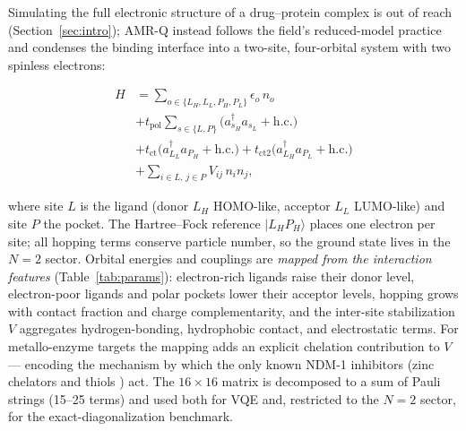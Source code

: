 \documentclass[10pt,twocolumn]{article}
\newcommand{\adag}{a^{\dagger}}
\begin{document}
Simulating the full electronic structure of a drug--protein complex is out of reach
(Section~\ref{sec:intro}); AMR-Q instead follows the field's reduced-model practice
\cite{santagati2024,kitajima2026} and condenses the binding interface into a two-site,
four-orbital system with two spinless electrons:

\begin{equation}
\begin{aligned}
H &= \sum_{o\in\{L_H,L_L,P_H,P_L\}} \epsilon_o\, n_o \\
  &+ t_{\mathrm{pol}} \sum_{s\in\{L,P\}} \bigl(\adag_{s_H} a_{s_L} + \mathrm{h.c.}\bigr) \\
  &+ t_{\mathrm{ct}} \bigl(\adag_{L_L} a_{P_H} + \mathrm{h.c.}\bigr)
   + t_{\mathrm{ct2}} \bigl(\adag_{L_H} a_{P_L} + \mathrm{h.c.}\bigr) \\
  &+ \sum_{i\in L,\,j\in P} V_{ij}\, n_i n_j ,
\end{aligned}
\label{eq:hamiltonian}
\end{equation}

where site $L$ is the ligand (donor $L_H$ HOMO-like, acceptor $L_L$ LUMO-like) and
site $P$ the pocket. The Hartree--Fock reference $|L_H P_H\rangle$ places one electron
per site; all hopping terms conserve particle number, so the ground state lives in the
$N{=}2$ sector. Orbital energies and couplings are \emph{mapped from the interaction
features} (Table~\ref{tab:params}): electron-rich ligands raise their donor level,
electron-poor ligands and polar pockets lower their acceptor levels, hopping grows with
contact fraction and charge complementarity, and the inter-site stabilization $V$
aggregates hydrogen-bonding, hydrophobic contact, and electrostatic terms. For
metallo-enzyme targets the mapping adds an explicit chelation contribution to $V$ ---
encoding the mechanism by which the only known NDM-1 inhibitors (zinc chelators and
thiols \cite{king2014,bush2019}) act. The $16\times16$ matrix is decomposed to a
sum of Pauli strings (15--25 terms) and used both for VQE and, restricted to the $N{=}2$
sector, for the exact-diagonalization benchmark.
\end{document}
